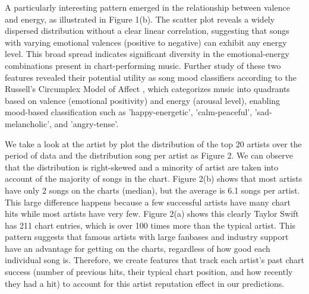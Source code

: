 \documentclass{article}
\begin{document}
\vspace{-2em}
A particularly interesting pattern emerged in the relationship between valence and energy, as illustrated in Figure 1(b). The scatter plot reveals a widely dispersed distribution without a clear linear correlation, suggesting that songs with varying emotional valences (positive to negative) can exhibit any energy level. This broad spread indicates significant diversity in the emotional-energy combinations present in chart-performing music. Further study of these two features revealed their potential utility as song mood classifiers according to the Russell's Circumplex Model of Affect \cite{russell1980circumplex}, which categorizes music into quadrants based on valence (emotional positivity) and energy (arousal level), enabling mood-based classification such as 'happy-energetic', 'calm-peaceful', 'sad-melancholic', and 'angry-tense'. 



We take a look at the artist by plot the distribution of the top 20 artists over the period of data and the distribution song per artist as Figure 2. We can observe that the distribution is right-skewed and a minority of artist are taken into account of the majority of songs in the chart.  Figure 2(b) shows that most artists have only 2 songs on the charts (median), but the average is 6.1 songs per artist. This large difference happens because a few successful artists have many chart hits while most artists have very few. Figure 2(a) shows this clearly Taylor Swift has 211 chart entries, which is over 100 times more than the typical artist. This pattern suggests that famous artists with large fanbases and industry support have an advantage for getting on the charts, regardless of how good each individual song is. Therefore, we create features that track each artist's past chart success (number of previous hits, their typical chart position, and how recently they had a hit) to account for this artist reputation effect in our predictions. 
\end{document}
